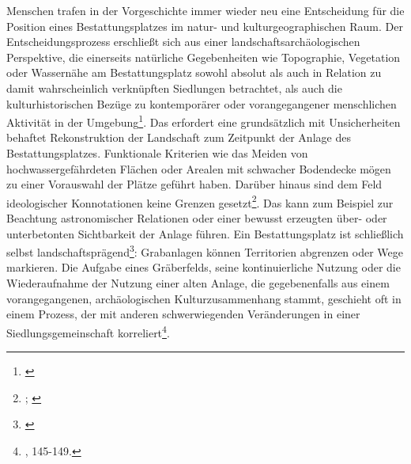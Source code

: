 \documentclass[openany,twoside,twocolumn]{book}
\let\rmarkdownfootnote\footnote%
\def\footnote{\protect\rmarkdownfootnote}
\begin{document}
Menschen trafen in der Vorgeschichte immer wieder neu eine Entscheidung
für die Position eines Bestattungsplatzes im natur- und
kulturgeographischen Raum. Der Entscheidungsprozess erschließt sich aus
einer landschaftsarchäologischen Perspektive, die einerseits natürliche
Gegebenheiten wie Topographie, Vegetation oder Wassernähe am
Bestattungsplatz sowohl absolut als auch in Relation zu damit
wahrscheinlich verknüpften Siedlungen betrachtet, als auch die
kulturhistorischen Bezüge zu kontemporärer oder vorangegangener
menschlichen Aktivität in der Umgebung\footnote{\textcite{balee_historical_1998}}.
Das erfordert eine grundsätzlich mit Unsicherheiten behaftet
Rekonstruktion der Landschaft zum Zeitpunkt der Anlage des
Bestattungsplatzes. Funktionale Kriterien wie das Meiden von
hochwassergefährdeten Flächen oder Arealen mit schwacher Bodendecke
mögen zu einer Vorauswahl der Plätze geführt haben. Darüber hinaus sind
dem Feld ideologischer Konnotationen keine Grenzen gesetzt\footnote{\textcite{artelius_bronze_1998};
  \textcite{stjernquist_introduction_1992-1}}. Das kann zum Beispiel zur
Beachtung astronomischer Relationen oder einer bewusst erzeugten über-
oder unterbetonten Sichtbarkeit der Anlage führen. Ein Bestattungsplatz
ist schließlich selbst landschaftsprägend\footnote{\textcite{enninger_friedhofe_1989}}:
Grabanlagen können Territorien abgrenzen oder Wege markieren. Die
Aufgabe eines Gräberfelds, seine kontinuierliche Nutzung oder die
Wiederaufnahme der Nutzung einer alten Anlage, die gegebenenfalls aus
einem vorangegangenen, archäologischen Kulturzusammenhang stammt,
geschieht oft in einem Prozess, der mit anderen schwerwiegenden
Veränderungen in einer Siedlungsgemeinschaft korreliert\footnote{\textcite{hofmann_rituelle_2008},
  145-149.}.
\end{document}
